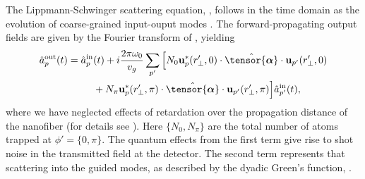 \documentclass[aps,pra,twocolumn]{revtex4-1} %
\newcommand{\poltens}{\hat{\tensor{\boldsymbol{\alpha}}}}
\begin{document}
The Lippmann-Schwinger scattering equation, , follows in the time domain as the evolution of coarse-grained input-ouput modes \cite{gardiner_input_1985, fan_input-output_2010, le_kien_propagation_2014}.  
The forward-propagating output fields are given by the Fourier transform of , yielding \cite{le_kien_correlations_2008} 
\begin{align} \label{Eq::ScatteringSolution}
		\hat{a}^{\rm out}_{p}(t) = \hat{a}^{\rm in}_{p}&(t) + i  \frac{2\pi \omega_0}{v_g}\sum_{p'}\Big[ N_0  \mathbf{u}^*_p(r'_\perp,0) \cdot \poltens \cdot  \mathbf{u}_{p'}(r'_\perp,0)  \nn\\
		&+ N_\pi \mathbf{u}^*_p(r'_\perp,\pi) \cdot \poltens \cdot  \mathbf{u}_{p'}(r'_\perp,\pi) \Big] \hat{a}^{\rm in}_{p'}(t),
	\end{align} 
where we have neglected effects of retardation over the propagation distance of the nanofiber (for details see \cite{le_kien_correlations_2008, baragiola_open_2014}).  
Here $\{N_0,N_\pi \}$ are the total number of atoms trapped at $\phi' = \{0,\pi\}$. 
The quantum effects from the first term give rise to shot noise in the transmitted field at the detector.  
The second term represents that scattering into the guided modes, as described by the dyadic Green's function, .  
\end{document}
